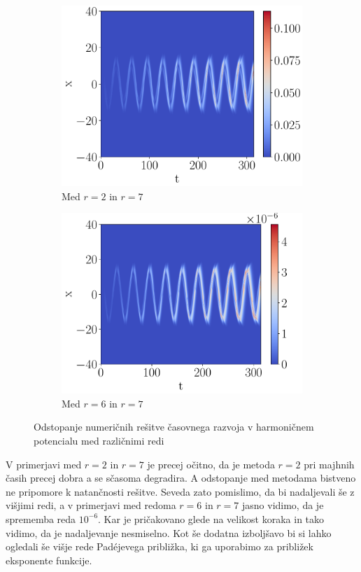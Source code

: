 \documentclass{article}
\begin{document}
\begin{figure}[H]
    \centering
    \begin{subfigure}{0.45\textwidth}
        \centering
        \includegraphics[width=\linewidth]{red27.pdf}
        \caption{Med $r=2$ in $r=7$}
    \end{subfigure}
    \hfill
    \begin{subfigure}{0.45\textwidth}
        \centering
        \includegraphics[width=\linewidth]{red67.pdf}
        \caption{Med $r=6$ in $r=7$}
    \end{subfigure}
	\caption{Odstopanje numeričnih rešitve časovnega razvoja v harmoničnem potencialu med različnimi redi}
\end{figure}
V primerjavi med $r=2$ in $r=7$ je precej očitno, da je metoda $r=2$ pri majhnih časih precej dobra a se sčasoma degradira. A odstopanje med metodama bistveno ne pripomore k natančnosti rešitve. Seveda zato pomislimo, da bi nadaljevali še z višjimi redi, a v primerjavi med redoma $r=6$ in $r=7$ jasno vidimo, da je sprememba reda $10^{-6}$. Kar je pričakovano glede na velikost koraka in tako vidimo, da je nadaljevanje nesmiselno. Kot še dodatna izboljšavo bi si lahko ogledali še višje rede Pad\'ejevega približka, ki ga uporabimo za približek eksponente funkcije.
\newpage
\end{document}
